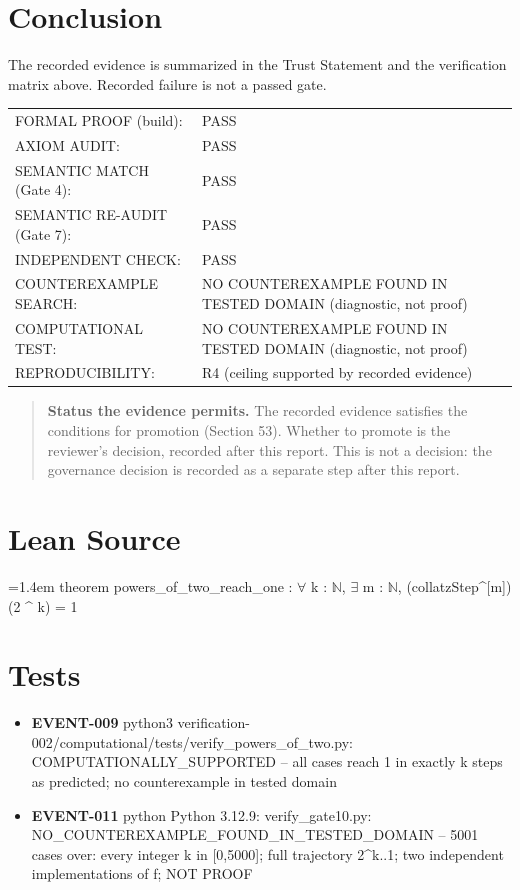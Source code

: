 \documentclass[11pt]{article}
\begin{document}
\section{Conclusion}
The recorded evidence is summarized in the Trust Statement and the verification matrix above. Recorded failure is not a passed gate.
\begin{center}\begin{tabular}{@{}p{}p{}@{}}
FORMAL PROOF (build): & PASS \\
AXIOM AUDIT: & PASS \\
SEMANTIC MATCH (Gate 4): & PASS \\
SEMANTIC RE-AUDIT (Gate 7): & PASS \\
INDEPENDENT CHECK: & PASS \\
COUNTEREXAMPLE SEARCH: & NO COUNTEREXAMPLE FOUND IN TESTED DOMAIN (diagnostic, not proof) \\
COMPUTATIONAL TEST: & NO COUNTEREXAMPLE FOUND IN TESTED DOMAIN (diagnostic, not proof) \\
REPRODUCIBILITY: & R4 (ceiling supported by recorded evidence) \\
\end{tabular}\end{center}
\begin{quote}\textbf{Status the evidence permits.} The recorded evidence satisfies the conditions for promotion (Section 53). Whether to promote is the reviewer's decision, recorded after this report. This is not a decision: the governance decision is recorded as a separate step after this report.\end{quote}
\appendix
\section{Lean Source}
{\footnotesize\ttfamily\raggedright\hangindent=1.4em\noindent
\hspace*{0.00em}theorem powers\_\allowbreak{}of\_\allowbreak{}two\_\allowbreak{}reach\_\allowbreak{}one : \ensuremath{\forall} k : \ensuremath{\mathbb{N}}, \ensuremath{\exists} m : \ensuremath{\mathbb{N}}, (collatzStep\textasciicircum{}[m]) (2 \textasciicircum{} k) = 1\par
}

\section{Tests}
\begin{itemize}
\item \textbf{EVENT-009} python3 verification-002/computational/tests/verify\_powers\_of\_two.py: COMPUTATIONALLY\_SUPPORTED -- all cases reach 1 in exactly k steps as predicted; no counterexample in tested domain
\item \textbf{EVENT-011} python Python 3.12.9: verify\_gate10.py: NO\_COUNTEREXAMPLE\_FOUND\_IN\_TESTED\_DOMAIN -- 5001 cases over: every integer k in [0,5000]; full trajectory 2\textasciicircum{}k..1; two independent implementations of f; NOT PROOF
\end{itemize}
\end{document}
